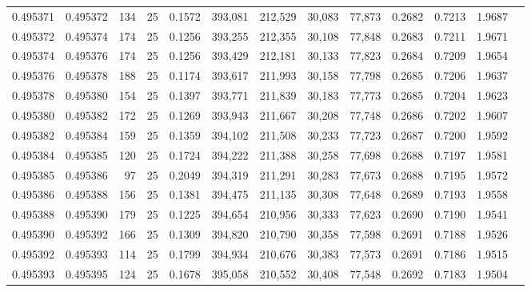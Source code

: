 \begin{tabular}{rrrrrrrrrrrrr}
0.495371 & 0.495372 &   134 &  25 &                                     0.1572 & 393,081 & 212,529 &  30,083 &  77,873 & 0.2682 & 0.7213 & 1.9687 \\
0.495372 & 0.495374 &   174 &  25 &                                     0.1256 & 393,255 & 212,355 &  30,108 &  77,848 & 0.2683 & 0.7211 & 1.9671 \\
0.495374 & 0.495376 &   174 &  25 &                                     0.1256 & 393,429 & 212,181 &  30,133 &  77,823 & 0.2684 & 0.7209 & 1.9654 \\
0.495376 & 0.495378 &   188 &  25 &                                     0.1174 & 393,617 & 211,993 &  30,158 &  77,798 & 0.2685 & 0.7206 & 1.9637 \\
0.495378 & 0.495380 &   154 &  25 &                                     0.1397 & 393,771 & 211,839 &  30,183 &  77,773 & 0.2685 & 0.7204 & 1.9623 \\
0.495380 & 0.495382 &   172 &  25 &                                     0.1269 & 393,943 & 211,667 &  30,208 &  77,748 & 0.2686 & 0.7202 & 1.9607 \\
0.495382 & 0.495384 &   159 &  25 &                                     0.1359 & 394,102 & 211,508 &  30,233 &  77,723 & 0.2687 & 0.7200 & 1.9592 \\
0.495384 & 0.495385 &   120 &  25 &                                     0.1724 & 394,222 & 211,388 &  30,258 &  77,698 & 0.2688 & 0.7197 & 1.9581 \\
0.495385 & 0.495386 &    97 &  25 &                                     0.2049 & 394,319 & 211,291 &  30,283 &  77,673 & 0.2688 & 0.7195 & 1.9572 \\
0.495386 & 0.495388 &   156 &  25 &                                     0.1381 & 394,475 & 211,135 &  30,308 &  77,648 & 0.2689 & 0.7193 & 1.9558 \\
0.495388 & 0.495390 &   179 &  25 &                                     0.1225 & 394,654 & 210,956 &  30,333 &  77,623 & 0.2690 & 0.7190 & 1.9541 \\
0.495390 & 0.495392 &   166 &  25 &                                     0.1309 & 394,820 & 210,790 &  30,358 &  77,598 & 0.2691 & 0.7188 & 1.9526 \\
0.495392 & 0.495393 &   114 &  25 &                                     0.1799 & 394,934 & 210,676 &  30,383 &  77,573 & 0.2691 & 0.7186 & 1.9515 \\
0.495393 & 0.495395 &   124 &  25 &                                     0.1678 & 395,058 & 210,552 &  30,408 &  77,548 & 0.2692 & 0.7183 & 1.9504 \\

\end{tabular}

